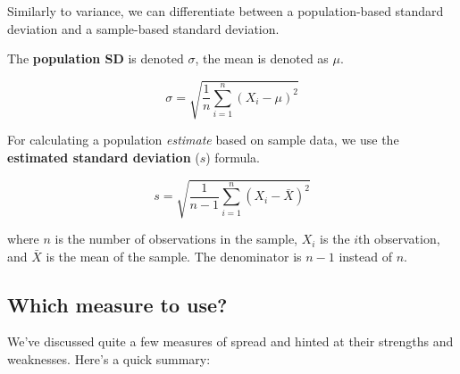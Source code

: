 \documentclass[
  11pt,
  a4paper,
  twoside,symmetric,openright]{book}
\theoremstyle{break}
\theoremstyle{break}
\begin{document}
\label{calloutSD}
\begin{callout}

Similarly to variance, we can differentiate between a population-based standard deviation and a sample-based standard deviation.

\begin{keepTogether}
The \textbf{population SD} is denoted \(\sigma\), the mean is denoted as \(\mu\).

\[
\sigma = \sqrt{ \frac{1}{n} \sum_{i=1}^n \left( X_i - \mu \right)^2 }
\]

\end{keepTogether}

\begin{keepTogether}
For calculating a population \emph{estimate} based on sample data, we use the \textbf{estimated standard deviation} (\(s\)) formula.

\[
s = \sqrt{ \frac{1}{n-1} \sum_{i=1}^n \left( X_i - \bar{X} \right)^2 }
\]

where \(n\) is the number of observations in the sample, \(X_i\) is the \(i\)th observation, and \(\bar{X}\) is the mean of the sample. The denominator is \(n-1\) instead of \(n\).

\end{keepTogether}

\end{callout}

\subsection{Which measure to use?}\label{which-measure-to-use}

We've discussed quite a few measures of spread and hinted at their strengths and weaknesses. Here's a quick summary:
\end{document}
